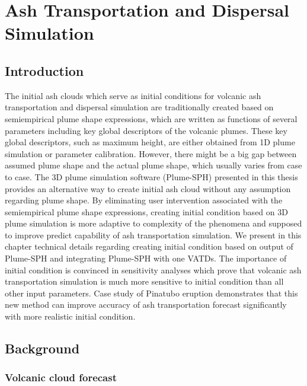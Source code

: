 \chapter{Ash Transportation and Dispersal Simulation} \label{chapter:ash-transportation}

\section{Introduction}

The initial ash clouds which serve as initial conditions for volcanic ash transportation and dispersal simulation are traditionally created based on semiempirical plume shape expressions, which are written as functions of several parameters including key global descriptors of the volcanic plumes. These key global descriptors, such as maximum height, are either obtained from 1D plume simulation or parameter calibration. However, there might be a big gap between assumed plume shape and the actual plume shape, which usually varies from case to case. The 3D plume simulation software (Plume-SPH) presented in this thesis provides an alternative way to create initial ash cloud without any assumption regarding plume shape. By eliminating user intervention associated with the semiempirical plume shape expressions, creating initial condition based on 3D plume simulation is more adaptive to complexity of the phenomena and supposed to improve predict capability of ash transportation simulation.
We present in this chapter technical details regarding creating initial condition based on output of Plume-SPH and integrating Plume-SPH with one VATDs.
The importance of initial condition is convinced in sensitivity analyses which prove that volcanic ash transportation simulation is much more sensitive to initial condition than all other input parameters.
Case study of Pinatubo eruption demonstrates that this new method can improve accuracy of ash transportation forecast significantly with more realistic initial condition.  

\section{Background}

\subsection{Volcanic cloud forecast}

